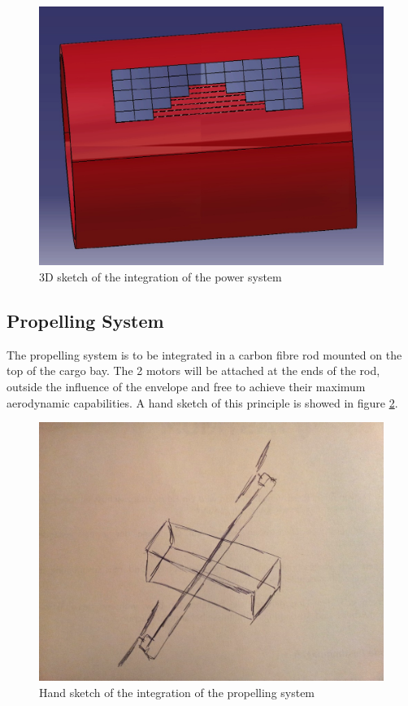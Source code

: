 \begin{figure}[bht]
\centering
\includegraphics[scale=0.3]{figures/mesh.jpg}
\caption{3D sketch of the integration of the power system}
\label{fig:mesh}
\end{figure}

\subsection{Propelling System}

The propelling system is to be integrated in a carbon fibre rod mounted on the top of the cargo bay. The 2 motors will be attached at the ends of the rod, outside the influence of the envelope and free to achieve their maximum aerodynamic capabilities. A hand sketch of this principle is showed in figure \ref{fig:prop}.

\begin{figure}[bht]
\centering
\includegraphics[width=\textwidth]{figures/prop.jpg}
\caption{Hand sketch of the integration of the propelling system}
\label{fig:prop}
\end{figure}

